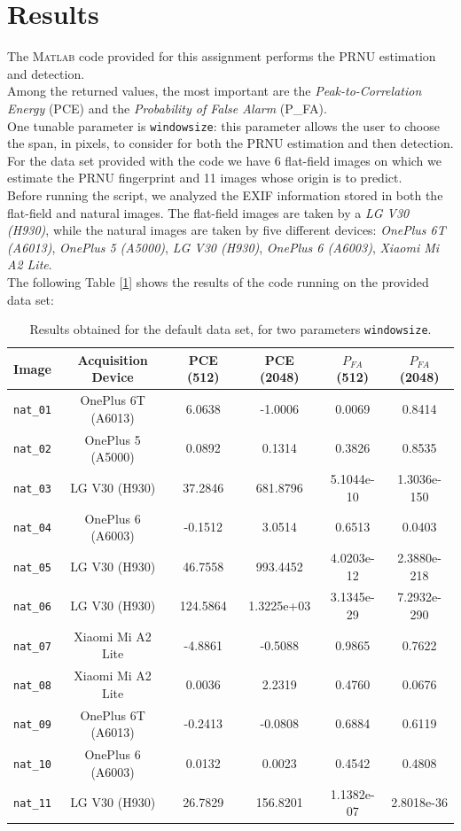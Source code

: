 \documentclass[a4paper, 12pt]{article}
\begin{document}
\section*{Results}
The \textsc{Matlab} code provided for this assignment performs the PRNU estimation and detection.\\
Among the returned values, the most important are the \textit{Peak-to-Correlation Energy} (PCE) and the \textit{Probability of False Alarm} (P\_FA).\\
One tunable parameter is \texttt{windowsize}: this parameter allows the user to choose the span, in pixels, to consider for both the PRNU estimation and then detection. \\
For the data set provided with the code we have 6 flat-field images on which we estimate the PRNU fingerprint and 11 images whose origin is to predict.\\
Before running the script, we analyzed the EXIF information stored in both the flat-field and natural images. The flat-field images are taken by a \textit{LG V30 (H930)}, while the natural images are taken by five different devices: \textit{OnePlus 6T (A6013)}, \textit{OnePlus 5 (A5000)}, \textit{LG V30 (H930)}, \textit{OnePlus 6 (A6003)}, \textit{Xiaomi Mi A2 Lite}. \\
The following Table [\ref{tab:defaultdataset}] shows the results of the code running on the provided data set:

\begin{table}[H]
	\centering

	\begin{tabular}{c|c|c|c|c|c}
	Image & Acquisition Device & PCE (512) & PCE (2048) & $P_{FA}$ (512) & $P_{FA}$ (2048) \\
	\toprule
	\texttt{nat\_01} & OnePlus 6T (A6013)	& 6.0638	& -1.0006 & 0.0069 & 0.8414 \\
	\texttt{nat\_02} & OnePlus 5 (A5000) 	& 0.0892	& 0.1314 & 0.3826 & 0.8535 \\
	\texttt{nat\_03} & LG V30 (H930) 	& 37.2846	& 681.8796	& 5.1044e-10 & 1.3036e-150\\
	\texttt{nat\_04} & OnePlus 6 (A6003) 	& -0.1512	& 3.0514	& 0.6513 & 0.0403 \\
	\texttt{nat\_05} & LG V30 (H930) 		& 46.7558	& 993.4452 & 4.0203e-12 & 2.3880e-218\\
	\texttt{nat\_06} & LG V30 (H930) 	& 124.5864	& 1.3225e+03 & 3.1345e-29 & 7.2932e-290\\
	\texttt{nat\_07} & Xiaomi Mi A2 Lite	& -4.8861	& -0.5088 & 0.9865 & 0.7622 \\
	\texttt{nat\_08} & Xiaomi Mi A2 Lite 	& 0.0036	& 2.2319 & 0.4760 & 0.0676 \\
	\texttt{nat\_09} & OnePlus 6T (A6013)	& -0.2413	& -0.0808 & 0.6884 & 0.6119\\
	\texttt{nat\_10} & OnePlus 6 (A6003) 	& 0.0132	& 0.0023 & 0.4542 & 0.4808\\
	\texttt{nat\_11} & LG V30 (H930) 		& 26.7829	& 156.8201 & 1.1382e-07 & 2.8018e-36
	\end{tabular}
	\caption{Results obtained for the default data set, for two parameters \texttt{windowsize}.}
	\label{tab:defaultdataset}
\end{table}
\end{document}
